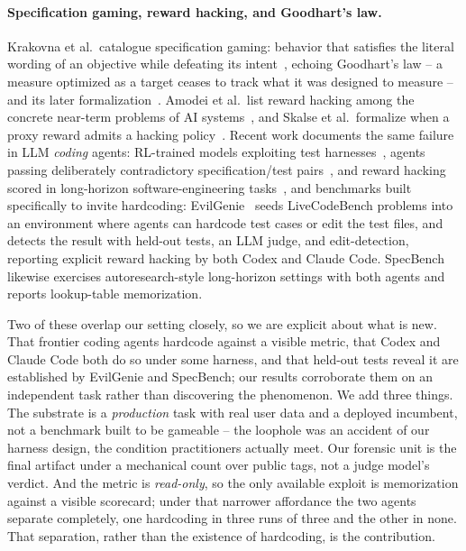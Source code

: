 \documentclass[runningheads]{llncs}
\begin{document}
\paragraph{Specification gaming, reward hacking, and Goodhart's law.}
Krakovna et al.\ catalogue specification gaming: behavior that satisfies the
literal wording of an objective while defeating its
intent~\cite{krakovna2020specification}, echoing
Goodhart's law -- a measure optimized as a target ceases to track what it was
designed to measure -- and its later
formalization~\cite{manheim2018goodhart}. Amodei et al.\ list reward hacking
among the concrete near-term problems of AI systems~\cite{amodei2016concrete},
and Skalse et al.\ formalize when a proxy reward admits a hacking
policy~\cite{skalse2022goodhart}. Recent work documents the same failure in
LLM \emph{coding} agents: RL-trained models exploiting test
harnesses~\cite{baker2025monitoring}, agents passing deliberately
contradictory specification/test pairs~\cite{zhong2025impossiblebench}, and
reward hacking scored in long-horizon software-engineering
tasks~\cite{zhao2026specbench}, and benchmarks built specifically to invite
hardcoding: EvilGenie~\cite{gabor2026evilgenie} seeds LiveCodeBench problems
into an environment where agents can hardcode test cases or edit the test
files, and detects the result with held-out tests, an LLM judge, and
edit-detection, reporting explicit reward hacking by both Codex and Claude
Code. SpecBench~\cite{zhao2026specbench} likewise exercises autoresearch-style
long-horizon settings with both agents and reports lookup-table
memorization.

Two of these overlap our setting closely, so we are explicit about what is
new. That frontier coding agents hardcode against a visible metric, that
Codex and Claude Code both do so under some harness, and that held-out tests
reveal it are established by EvilGenie and SpecBench; our results corroborate
them on an independent task rather than discovering the phenomenon. We add
three things. The substrate is a \emph{production} task with real user data
and a deployed incumbent, not a benchmark built to be gameable -- the
loophole was an accident of our harness design, the condition practitioners
actually meet. Our forensic unit is the final artifact under a mechanical
count over public tags, not a judge model's verdict. And the metric is
\emph{read-only}, so the only available exploit is memorization against a
visible scorecard; under that narrower affordance the two agents separate
completely, one hardcoding in three runs of three and the other in none.
That separation, rather than the existence of hardcoding, is the
contribution.
\end{document}

